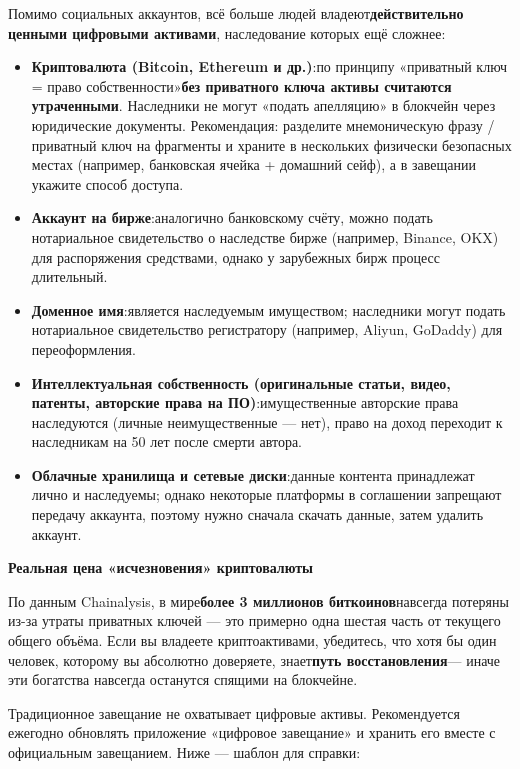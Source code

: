 
Помимо социальных аккаунтов, всё больше людей владеют\textbf{действительно ценными цифровыми активами}, наследование которых ещё сложнее:

\begin{itemize}
  \item \textbf{Криптовалюта (Bitcoin, Ethereum и др.)}:по принципу «приватный ключ = право собственности»\textbf{без приватного ключа активы считаются утраченными}. Наследники не могут «подать апелляцию» в блокчейн через юридические документы. Рекомендация: разделите мнемоническую фразу / приватный ключ на фрагменты и храните в нескольких физически безопасных местах (например, банковская ячейка + домашний сейф), а в завещании укажите способ доступа.
  \item \textbf{Аккаунт на бирже}:аналогично банковскому счёту, можно подать нотариальное свидетельство о наследстве бирже (например, Binance, OKX) для распоряжения средствами, однако у зарубежных бирж процесс длительный.
  \item \textbf{Доменное имя}:является наследуемым имуществом; наследники могут подать нотариальное свидетельство регистратору (например, Aliyun, GoDaddy) для переоформления.
  \item \textbf{Интеллектуальная собственность (оригинальные статьи, видео, патенты, авторские права на ПО)}:имущественные авторские права наследуются (личные неимущественные — нет), право на доход переходит к наследникам на 50 лет после смерти автора.
  \item \textbf{Облачные хранилища и сетевые диски}:данные контента принадлежат лично и наследуемы; однако некоторые платформы в соглашении запрещают передачу аккаунта, поэтому нужно сначала скачать данные, затем удалить аккаунт.
\end{itemize}

\textbf{Реальная цена «исчезновения» криптовалюты}\par

По данным Chainalysis, в мире\textbf{более 3 миллионов биткоинов}навсегда потеряны из-за утраты приватных ключей — это примерно одна шестая часть от текущего общего объёма. Если вы владеете криптоактивами, убедитесь, что хотя бы один человек, которому вы абсолютно доверяете, знает\textbf{путь восстановления}— иначе эти богатства навсегда останутся спящими на блокчейне.


Традиционное завещание не охватывает цифровые активы. Рекомендуется ежегодно обновлять приложение «цифровое завещание» и хранить его вместе с официальным завещанием. Ниже — шаблон для справки:

